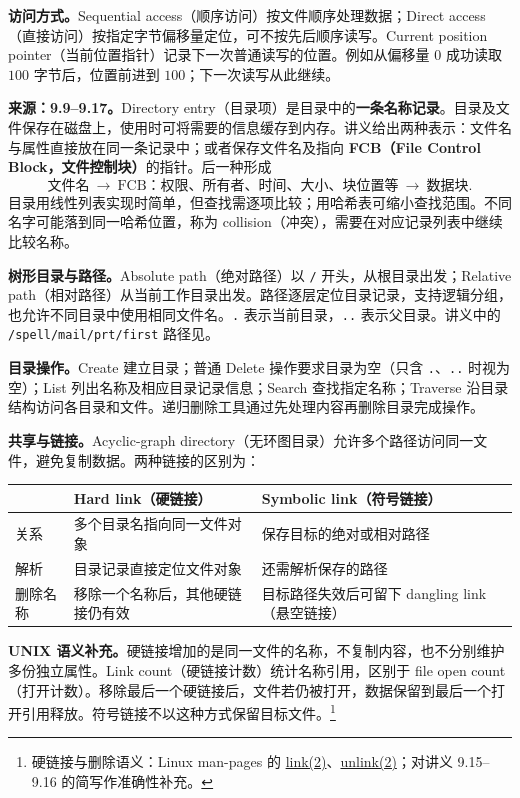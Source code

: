 \textbf{访问方式。}Sequential access（顺序访问）按文件顺序处理数据；Direct access（直接访问）按指定字节偏移量定位，可不按先后顺序读写。Current position pointer（当前位置指针）记录下一次普通读写的位置。例如从偏移量 $0$ 成功读取 $100$ 字节后，位置前进到 $100$；下一次读写从此继续。


\textbf{来源：9.9--9.17。}Directory entry（目录项）是目录中的\textbf{一条名称记录}。目录及文件保存在磁盘上，使用时可将需要的信息缓存到内存。讲义给出两种表示：文件名与属性直接放在同一条记录中；或者保存文件名及指向 \textbf{FCB（File Control Block，文件控制块）}的指针。后一种形成
\[
  \text{文件名}\ \longrightarrow\ \text{FCB：权限、所有者、时间、大小、块位置等}\
  \longrightarrow\ \text{数据块}.
\]
目录用线性列表实现时简单，但查找需逐项比较；用哈希表可缩小查找范围。不同名字可能落到同一哈希位置，称为 collision（冲突），需要在对应记录列表中继续比较名称。

\textbf{树形目录与路径。}Absolute path（绝对路径）以 \texttt{/} 开头，从根目录出发；Relative path（相对路径）从当前工作目录出发。路径逐层定位目录记录，支持逻辑分组，也允许不同目录中使用相同文件名。\texttt{.} 表示当前目录，\texttt{..} 表示父目录。讲义中的 \texttt{/spell/mail/prt/first} 路径见。

\textbf{目录操作。}Create 建立目录；普通 Delete 操作要求目录为空（只含 \texttt{.}、\texttt{..} 时视为空）；List 列出名称及相应目录记录信息；Search 查找指定名称；Traverse 沿目录结构访问各目录和文件。递归删除工具通过先处理内容再删除目录完成操作。

\textbf{共享与链接。}Acyclic-graph directory（无环图目录）允许多个路径访问同一文件，避免复制数据。两种链接的区别为：
\begin{center}
\begin{tabularx}{\textwidth}{@{}l>{\raggedright\arraybackslash}X>{\raggedright\arraybackslash}X@{}}
\toprule
 & Hard link（硬链接） & Symbolic link（符号链接） \\
\midrule
关系 & 多个目录名指向同一文件对象 & 保存目标的绝对或相对路径 \\
解析 & 目录记录直接定位文件对象 & 还需解析保存的路径 \\
删除名称 & 移除一个名称后，其他硬链接仍有效 & 目标路径失效后可留下 dangling link（悬空链接） \\
\bottomrule
\end{tabularx}
\end{center}
\textbf{UNIX 语义补充。}硬链接增加的是同一文件的名称，不复制内容，也不分别维护多份独立属性。Link count（硬链接计数）统计名称引用，区别于 file open count（打开计数）。移除最后一个硬链接后，文件若仍被打开，数据保留到最后一个打开引用释放。符号链接不以这种方式保留目标文件。\footnote{硬链接与删除语义：Linux man-pages 的 \href{https://man7.org/linux/man-pages/man2/link.2.html}{link(2)}、\href{https://man7.org/linux/man-pages/man2/unlink.2.html}{unlink(2)}；对讲义 9.15--9.16 的简写作准确性补充。}


